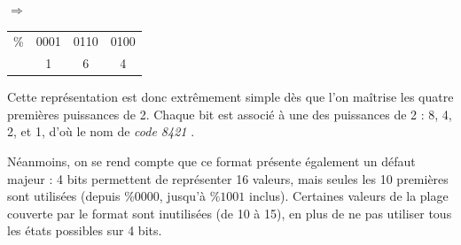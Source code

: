 \documentclass[11pt,a4paper]{article}
\begin{document}
\bigskip

\begin{table}[!ht]
  \centering
  \begin{minipage}{0.35\textwidth}
    \raggedleft

$ \Rightarrow $

  \end{minipage}
  \hfillx
  \begin{minipage}{0.60\textwidth}
    \raggedright

\begin{tabular}{ c  c c c }
\% & 0001 & 0110 & 0100 \\
   &    1 &    6 &    4 \\
\end{tabular}

  \end{minipage}
\end{table}

\smallskip

Cette représentation est donc extrêmement simple dès que l'on maîtrise les quatre premières puissances de 2.
Chaque bit est associé à une des puissances de 2 : 8, 4, 2, et 1, d'où le nom de \og \textit{code 8421} \fg{}.

Néanmoins, on se rend compte que ce format présente également un défaut majeur : 4 bits permettent de représenter 16 valeurs, mais seules les 10 premières sont utilisées (depuis $ \text{\%} 0000 $, jusqu'à $ \text{\%} 1001 $ inclus).
Certaines valeurs de la plage couverte par le format sont inutilisées (de 10 à 15), en plus de ne pas utiliser tous les états possibles sur 4 bits.


\vfillFirst
\end{document}
